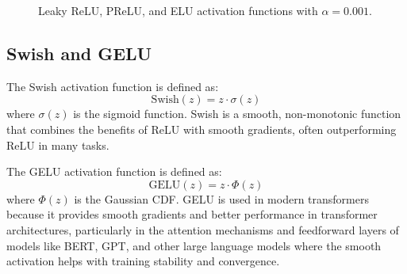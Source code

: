 \begin{figure}[htbp]
\caption{Leaky ReLU, PReLU, and ELU activation functions with $\alpha=0.001$.}
\label{fig:leaky-relu-variants}
\end{figure}

\subsection{Swish and GELU}

\begin{definition}
The Swish activation function is defined as:
\begin{equation}
\text{Swish}(z) = z \cdot \sigma(z)
\end{equation}
where $\sigma(z)$ is the sigmoid function. Swish is a smooth, non-monotonic function that combines the benefits of ReLU with smooth gradients, often outperforming ReLU in many tasks.
\end{definition}

\begin{definition}
The GELU activation function is defined as:
\begin{equation}
\text{GELU}(z) = z \cdot \Phi(z)
\end{equation}
where $\Phi(z)$ is the Gaussian CDF. GELU is used in modern transformers because it provides smooth gradients and better performance in transformer architectures, particularly in the attention mechanisms and feedforward layers of models like BERT, GPT, and other large language models where the smooth activation helps with training stability and convergence.
\end{definition}

